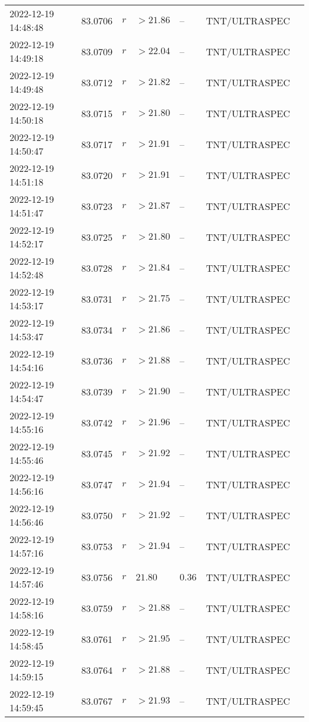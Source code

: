\documentclass{nature_plusfigure}
\begin{document}
\begin{supplement}
\begin{center}
\begin{longtable}{lllllll}
2022-12-19 14:48:48 & 83.0706 & $r$ & $>21.86$ & -- & TNT/ULTRASPEC &  \\ 
2022-12-19 14:49:18 & 83.0709 & $r$ & $>22.04$ & -- & TNT/ULTRASPEC &  \\ 
2022-12-19 14:49:48 & 83.0712 & $r$ & $>21.82$ & -- & TNT/ULTRASPEC &  \\ 
2022-12-19 14:50:18 & 83.0715 & $r$ & $>21.80$ & -- & TNT/ULTRASPEC &  \\ 
2022-12-19 14:50:47 & 83.0717 & $r$ & $>21.91$ & -- & TNT/ULTRASPEC &  \\ 
2022-12-19 14:51:18 & 83.0720 & $r$ & $>21.91$ & -- & TNT/ULTRASPEC &  \\ 
2022-12-19 14:51:47 & 83.0723 & $r$ & $>21.87$ & -- & TNT/ULTRASPEC &  \\ 
2022-12-19 14:52:17 & 83.0725 & $r$ & $>21.80$ & -- & TNT/ULTRASPEC &  \\ 
2022-12-19 14:52:48 & 83.0728 & $r$ & $>21.84$ & -- & TNT/ULTRASPEC &  \\ 
2022-12-19 14:53:17 & 83.0731 & $r$ & $>21.75$ & -- & TNT/ULTRASPEC &  \\ 
2022-12-19 14:53:47 & 83.0734 & $r$ & $>21.86$ & -- & TNT/ULTRASPEC &  \\ 
2022-12-19 14:54:16 & 83.0736 & $r$ & $>21.88$ & -- & TNT/ULTRASPEC &  \\ 
2022-12-19 14:54:47 & 83.0739 & $r$ & $>21.90$ & -- & TNT/ULTRASPEC &  \\ 
2022-12-19 14:55:16 & 83.0742 & $r$ & $>21.96$ & -- & TNT/ULTRASPEC &  \\ 
2022-12-19 14:55:46 & 83.0745 & $r$ & $>21.92$ & -- & TNT/ULTRASPEC &  \\ 
2022-12-19 14:56:16 & 83.0747 & $r$ & $>21.94$ & -- & TNT/ULTRASPEC &  \\ 
2022-12-19 14:56:46 & 83.0750 & $r$ & $>21.92$ & -- & TNT/ULTRASPEC &  \\ 
2022-12-19 14:57:16 & 83.0753 & $r$ & $>21.94$ & -- & TNT/ULTRASPEC &  \\ 
2022-12-19 14:57:46 & 83.0756 & $r$ & $21.80$ & $0.36$ & TNT/ULTRASPEC &  \\ 
2022-12-19 14:58:16 & 83.0759 & $r$ & $>21.88$ & -- & TNT/ULTRASPEC &  \\ 
2022-12-19 14:58:45 & 83.0761 & $r$ & $>21.95$ & -- & TNT/ULTRASPEC &  \\ 
2022-12-19 14:59:15 & 83.0764 & $r$ & $>21.88$ & -- & TNT/ULTRASPEC &  \\ 
2022-12-19 14:59:45 & 83.0767 & $r$ & $>21.93$ & -- & TNT/ULTRASPEC &  \\ 

\end{longtable}
\end{center}
\end{supplement}
\end{document}
